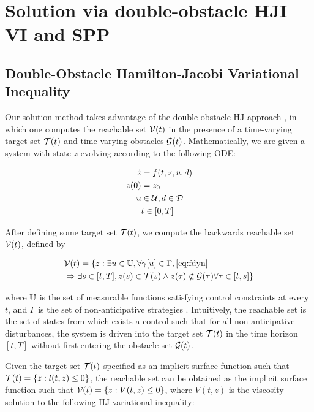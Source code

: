 \section{Solution via double-obstacle HJI VI and SPP\label{sec:solution}}
\subsection{Double-Obstacle Hamilton-Jacobi Variational Inequality}
Our solution method takes advantage of the double-obstacle HJ approach \cite{Fisac15}, in which one computes the reachable set $\mathcal{V}(t)$ in the presence of a time-varying target set $\mathcal{T}(t)$ and time-varying obstacles $\mathcal{G}(t)$. Mathematically, we are given a system with state $z$ evolving according to the following ODE:

\begin{equation}
\label{eq:fdyn} %
\begin{aligned}
\dot{z} &= f(t, z, u, d) \\
z(0) &= z_0 \\
u &\in \cset, d \in \dset \\
&t \in [0, T]
\end{aligned}
\end{equation}

After defining some target set $\mathcal{T}(t)$, we compute the backwards reachable set $\mathcal{V}(t)$, defined by

\begin{equation}
\label{eq:brs}
\begin{aligned}
&\mathcal{V}(t) = \{z: \exists u \in \mathbb{U}, \forall \gamma[u] \in \Gamma, \eqref{eq:fdyn} \\
&\Rightarrow \exists s \in [t, T], z(s) \in \mathcal{T}(s) \wedge z(\tau) \notin \mathcal{G}(\tau) \forall \tau \in [t, s]\}
\end{aligned}
\end{equation}

\noindent where $\mathbb{U}$ is the set of measurable functions satisfying control constraints at every $t$, and $\Gamma$ is the set of non-anticipative strategies \cite{Mitchell05}. Intuitively, the reachable set is the set of states from which exists a control such that for all non-anticipative disturbances, the system is driven into the target set $\mathcal{T}(t)$ in the time horizon $[t, T]$ without first entering the obstacle set $\mathcal{G}(t)$.

Given the target set $\mathcal{T}(t)$ specified as an implicit surface function such that $\mathcal{T}(t) = \{z: l(t, z) \le 0\}$, the reachable set can be obtained as the implicit surface function such that $\mathcal{V}(t) = \{z: V(t, z) \le 0\}$, where $V(t, z)$ is the viscosity solution \cite{Crandall83} to the following HJ variational inequality:

